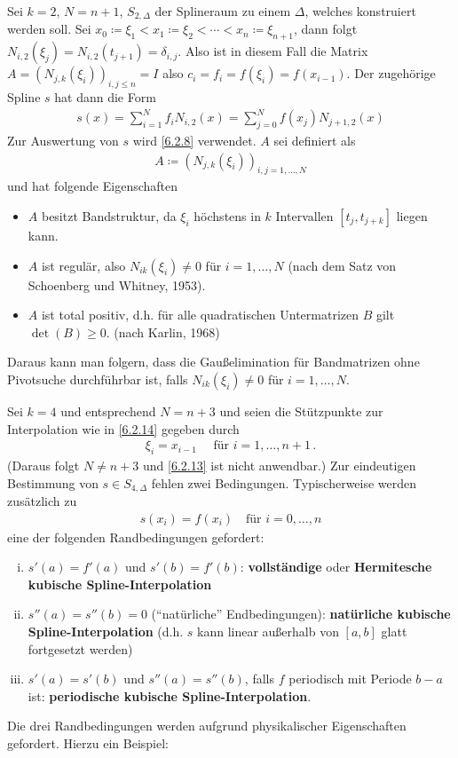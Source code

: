 \label{6.2.14}
Sei $k=2$, $N=n+1$, $S_{2,\Delta}$ der Splineraum zu einem $\Delta$,
welches konstruiert werden soll.
\label{im6.2.14}
Sei $x_0\coloneqq \xi_1<x_1\coloneqq \xi_2<\dotsb<x_n\coloneqq
\xi_{n+1}$, dann folgt $N_{i,2}(\xi_j)=N_{i,2}(t_{j+1})=\delta_{i,j}$.
Also ist in diesem Fall die Matrix $A=(N_{j,k}(\xi_i))_{i,j\leq n}=I$
also $c_i=f_i=f(\xi_i)=f(x_{i-1})$.
Der zugehörige Spline $s$ hat dann die Form
\begin{gather*}
  s(x) = \sum_{i=1}^{N}f_i N_{i,2}(x) 
  = \sum_{j=0}^{N}f(x_j)N_{j+1,2}(x)
\end{gather*}
Zur Auswertung von $s$ wird \ref{6.2.8} verwendet.
$A$ sei definiert als
\begin{gather*}
  A \coloneqq \left(N_{j,k}(\xi_i)\right)_{i,j=1,\dotsc,N}
\end{gather*}
und hat folgende Eigenschaften
\begin{itemize}
\item  $A$ besitzt Bandstruktur, da  $\xi_i$ höchstens in $k$
  Intervallen $[t_j, t_{j+k}]$ liegen kann.
\item $A$ ist regulär, also $N_{ik}(\xi_i)\neq 0$
  für $i=1, \dotsc, N$ (nach dem Satz von Schoenberg und Whitney, 1953).
\item $A$ ist total positiv, d.h. für alle quadratischen
  Untermatrizen $B$ gilt $\det(B)\geq 0$.
  (nach Karlin, 1968)
\end{itemize}

Daraus kann man folgern, dass
die Gaußelimination für Bandmatrizen ohne Pivotsuche
durchführbar ist, falls $N_{ik}(\xi_i) \neq 0$
für $i =1, \dotsc, N$.


 \label{6.2.15}
Sei $k=4$ und entsprechend $N=n+3$ und 
seien die Stützpunkte zur Interpolation wie in \ref{6.2.14}
gegeben durch 
\begin{gather*}
  \xi_i = x_{i-1} \quad \text{ für } i=1, \dotsc, n+1\,.
\end{gather*}
(Daraus folgt $N\neq n+3$ und \ref{6.2.13} ist nicht anwendbar.)
Zur eindeutigen Bestimmung von $s\in S_{4,\Delta}$ fehlen zwei
Bedingungen.
Typischerweise werden 
zusätzlich zu 
\begin{gather*}
  s(x_i)=f(x_i) \quad \text{für } i=0,\dotsc,n
\end{gather*} 
eine der folgenden Randbedingungen gefordert:
\begin{enumerate}[i)]
\item $s'(a)=f'(a)$ und $s'(b)=f'(b)$: 
  \textbf{vollständige} oder \textbf{Hermitesche kubische 
    Spline-Interpolation} 
\item $s''(a)=s''(b)=0$ (\enquote{natürliche}  Endbedingungen):
  \textbf{natürliche kubische Spline-Interpolation}
  (d.h. $s$ kann linear außerhalb von $[a,b]$ glatt fortgesetzt
  werden) 
\item $s'(a)=s'(b)$ und $s''(a)=s''(b)$,
  falls $f$ periodisch mit Periode $b-a$ ist:
  \textbf{periodische kubische Spline-Interpolation}.
\end{enumerate}
Die drei Randbedingungen werden aufgrund physikalischer
Eigenschaften gefordert. Hierzu ein Beispiel: 

